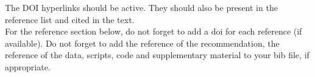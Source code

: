 \documentclass[PCJ,Unicode,screen]{cedram}
\begin{document}
The DOI hyperlinks should be active. They should also be present in the reference list and cited in the text.
\\For the reference section below, do not forget to add a doi for each reference (if available). Do not forget to add the reference of the recommendation, the reference of the data, scripts, code and supplementary material to your bib file, if appropriate.

\printbibliography
\end{document}
